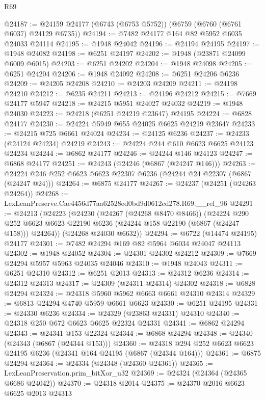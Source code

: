 \begin{lexlean}{R69}
\begin{coremodule}
{@24187 := @24159 @24177 (@6743 (@6753 @5752)) (@6759 (@6760 (@6761 @6037) @24129 @6735))
@24194 := @7482 @24177 @164 @82 @5952 @6035 @24033 @24114
@24195 := @1948 @24042
@24196 := @24194 @24195
@24197 := @1948 @24082
@24198 := @6251 @24197
@24202 := @1948 (@23871 @24099 @6009 @6015)
@24203 := @6251 @24202
@24204 := @1948 @24098
@24205 := @6251 @24204
@24206 := @1948 @24092
@24208 := @6251 @24206 @6236
@24209 := @24205 @24208
@24210 := @24203 @24209
@24211 := @24198 @24210
@24212 := @6235 @24211
@24213 := @24196 @24212
@24215 := @7669 @24177 @5947
@24218 := @24215 @5951 @24027 @24032
@24219 := @1948 @24030
@24223 := @24218 (@6251 @24219 @23647) @24195
@24224 := @6828 @24177
@24230 := @24224 @5949 @655 @24025 @6625 @24219 @23647
@24233 := @24215 @725 @6661 @24024
@24234 := @24125 @6236
@24237 := @24233 (@24124 @24234) @24219
@24243 := @24224 @244 @610 @6623 @6625 @24123 @24234
@24244 := @6862 @24177
@24246 := @24244 @146 @24123
@24247 := @6868 @24177
@24251 := @24243 (@24246 (@6867 (@24247 @146)))
@24263 := @24224 @246 @252 @6623 @6623 @22307 @6236 (@24244 @24 @22307 (@6867 (@24247 @24)))
@24264 := @6875 @24177
@24267 := @24237 (@24251 (@24263 @24264))
@24268 := LexLeanPreserve.Cae4456d77aa62528ed0bd9d0612cd278.R69.__rel_96
@24291 := @24213
    (@24223
      (@24230
        (@24267 (@24268 @8470 @8466))
        (@24224
          @290
          @252
          @6623
          @6623
          @22190
          @6236
          (@24244 @158 @22190 (@6867 (@24247 @158)))
          @24264))
      (@24268 @24030 @6632))
@24294 := @6722 (@14474 @24195) @24177
@24301 := @7482 @24294 @169 @82 @5964 @6034 @24047 @24113
@24302 := @1948 @24052
@24304 := @24301 @24302 @24212
@24309 := @7669 @24294 @5957 @5963 @24035 @24046
@24310 := @1948 @24043
@24311 := @6251 @24310
@24312 := @6251 @2013
@24313 := @24312 @6236
@24314 := @24312 @24313
@24317 := @24309 (@24311 @24314) @24302
@24318 := @6828 @24294
@24324 := @24318 @5960 @5962 @6663 @6661 @24310 @24314
@24329 := @6813 @24294 @4740 @5959 @6661 @6623
@24330 := @6251 @24195
@24331 := @24330 @6236
@24334 := @24329 (@23863 @24331) @24310
@24340 := @24318 @250 @672 @6623 @6625 @22324 @24331
@24341 := @6862 @24294
@24343 := @24341 @153 @22324
@24344 := @6868 @24294
@24348 := @24340 (@24343 (@6867 (@24344 @153)))
@24360 := @24318 @294 @252 @6623 @6623 @24195 @6236 (@24341 @164 @24195 (@6867 (@24344 @164)))
@24361 := @6875 @24294
@24364 := @24334 (@24348 (@24360 @24361))
@24365 := LexLeanPreservation.prim_bitXor_u32
@24369 := @24324 (@24364 (@24365 @6686 @24042))
@24370 := @24318 @2014
@24375 := @24370 @2016 @6623 @6625 @2013 @24313
}
\end{coremodule}
\end{lexlean}
